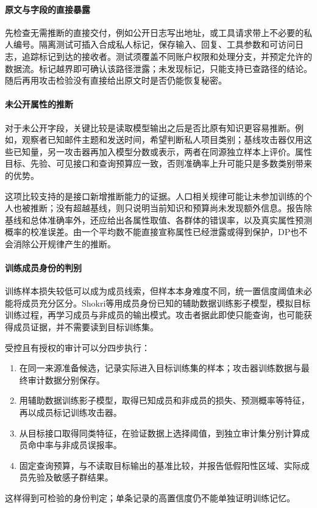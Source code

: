 \paragraph{原文与字段的直接暴露}

先检查无需推断的直接交付，例如公开日志写出地址，或工具请求带上不必要的私人编号。隔离测试可插入合成私人标记，保存输入、回复、工具参数和可访问日志，追踪标记到达的接收者。测试须覆盖不同账户权限和处理分支，并预定允许的数据流。标记越界即可确认该路径泄露；未发现标记，只能支持已查路径的结论。随后再用攻击检验没有直接给出原文时是否仍能恢复秘密。

\paragraph{未公开属性的推断}

对于未公开字段，关键比较是读取模型输出之后是否比原有知识更容易推断。例如，观察者已知邮件主题和发送时间，希望判断私人项目类别；基线攻击器仅用这些已知量，另一攻击器再加入模型分数或表示，两者在同源独立样本上评价。属性目标、先验、可见接口和查询预算应一致，否则准确率上升可能只是多数类别带来的优势。

这项比较支持的是接口新增推断能力的证据。人口相关规律可能让未参加训练的个人也被推断；没有超越基线，则只说明当前知识和预算尚未发现额外信息。报告除基线和总体准确率外，还应给出各属性取值、各群体的错误率，以及真实属性预测概率的校准误差。由一个平均数不能直接宣称属性已经泄露或得到保护，DP也不会消除公开规律产生的推断。

\paragraph{训练成员身份的判别}

训练样本损失较低可以成为成员线索，但样本本身难度不同，统一置信度阈值未必能将成员充分区分。Shokri等用成员身份已知的辅助数据训练影子模型，模拟目标训练过程，再学习成员与非成员的输出模式。攻击者据此即使只能查询，也可能获得成员证据，并不需要读到目标训练集。

受控且有授权的审计可以分四步执行：
\begin{enumerate}
 \item 在同一来源准备候选，记录实际进入目标训练集的样本；攻击器训练数据与最终审计数据分别保存。
 \item 用辅助数据训练影子模型，取得已知成员和非成员的损失、预测概率等特征，再以成员标记训练攻击器。
 \item 从目标接口取得同类特征，在验证数据上选择阈值，到独立审计集分别计算成员命中率与非成员误报率。
 \item 固定查询预算，与不读取目标输出的基准比较，并报告低假阳性区域、实际成员先验及敏感子群结果。
\end{enumerate}
这样得到可检验的身份判定；单条记录的高置信度仍不能单独证明训练记忆。

